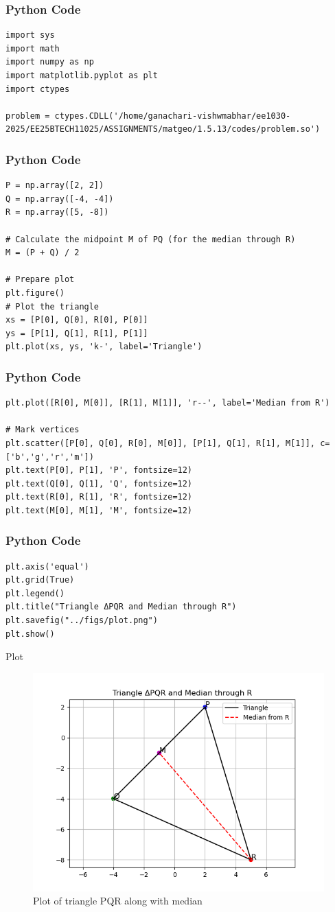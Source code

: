 \documentclass{beamer}
\begin{document}
\begin{frame}[fragile]
    \frametitle{Python Code}
    \begin{lstlisting}
import sys
import math
import numpy as np
import matplotlib.pyplot as plt
import ctypes

problem = ctypes.CDLL('/home/ganachari-vishwmabhar/ee1030-2025/EE25BTECH11025/ASSIGNMENTS/matgeo/1.5.13/codes/problem.so')
    \end{lstlisting}
\end{frame}

\begin{frame}[fragile]
    \frametitle{Python Code}
    \begin{lstlisting}
P = np.array([2, 2])
Q = np.array([-4, -4])
R = np.array([5, -8])

# Calculate the midpoint M of PQ (for the median through R)
M = (P + Q) / 2

# Prepare plot
plt.figure()
# Plot the triangle
xs = [P[0], Q[0], R[0], P[0]]
ys = [P[1], Q[1], R[1], P[1]]
plt.plot(xs, ys, 'k-', label='Triangle')
    \end{lstlisting}
\end{frame}

\begin{frame}[fragile]
    \frametitle{Python Code}
    \begin{lstlisting}
plt.plot([R[0], M[0]], [R[1], M[1]], 'r--', label='Median from R')

# Mark vertices
plt.scatter([P[0], Q[0], R[0], M[0]], [P[1], Q[1], R[1], M[1]], c=['b','g','r','m'])
plt.text(P[0], P[1], 'P', fontsize=12)
plt.text(Q[0], Q[1], 'Q', fontsize=12)
plt.text(R[0], R[1], 'R', fontsize=12)
plt.text(M[0], M[1], 'M', fontsize=12)
    \end{lstlisting}
\end{frame}

\begin{frame}[fragile]
    \frametitle{Python Code}
    \begin{lstlisting}
plt.axis('equal')
plt.grid(True)
plt.legend()
plt.title("Triangle ΔPQR and Median through R")
plt.savefig("../figs/plot.png")
plt.show()
    \end{lstlisting}
\end{frame}

\begin{frame}{Plot}
    \begin{figure}
        \centering
        \includegraphics[width=0.5\columnwidth]{../figs/plot.png}
        \caption{Plot of triangle PQR along with median}
        \label{fig:fig}
    \end{figure}
\end{frame}
\end{document}
